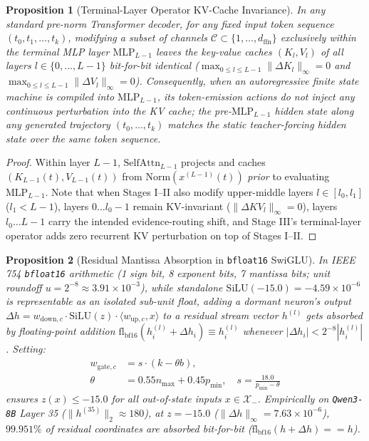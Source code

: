 \documentclass[10pt,twocolumn]{article}
\newtheorem{proposition}{Proposition}
\begin{document}
\begin{proposition}[Terminal-Layer Operator KV-Cache Invariance]
\label{prop:zerokv}
In any standard pre-norm Transformer decoder, for any fixed input token sequence $(t_0, t_1, \dots, t_k)$, modifying a subset of channels $\mathcal{C} \subset \{1, \dots, d_{\mathrm{ffn}}\}$ exclusively within the terminal MLP layer $\mathrm{MLP}_{L-1}$ leaves the key-value caches $(K_l, V_l)$ of all layers $l \in \{0, \dots, L-1\}$ bit-for-bit identical ($\max_{0 \le l \le L-1} \|\Delta K_l\|_\infty = 0$ and $\max_{0 \le l \le L-1} \|\Delta V_l\|_\infty = 0$). Consequently, when an autoregressive finite state machine is compiled into $\mathrm{MLP}_{L-1}$, its token-emission actions do not inject any continuous perturbation into the KV cache; the pre-$\mathrm{MLP}_{L-1}$ hidden state along any generated trajectory $(t_0, \dots, t_k)$ matches the static teacher-forcing hidden state over the same token sequence.
\end{proposition}
\begin{proof}
Within layer $L-1$, $\mathrm{SelfAttn}_{L-1}$ projects and caches $(K_{L-1}(t), V_{L-1}(t))$ from $\mathrm{Norm}(x^{(L-1)}(t))$ \emph{prior} to evaluating $\mathrm{MLP}_{L-1}$. Note that when Stages I--II also modify upper-middle layers $l \in [l_0, l_1]$ ($l_1 < L-1$), layers $0 \dots l_0-1$ remain KV-invariant ($\|\Delta KV_l\|_\infty = 0$), layers $l_0 \dots L-1$ carry the intended evidence-routing shift, and Stage III's terminal-layer operator adds zero recurrent KV perturbation on top of Stages I--II.
\end{proof}

\begin{proposition}[Residual Mantissa Absorption in \texttt{bfloat16} SwiGLU]
\label{prop:underflow}
In IEEE 754 \texttt{bfloat16} arithmetic (1 sign bit, 8 exponent bits, 7 mantissa bits; unit roundoff $u = 2^{-8} \approx 3.91 \times 10^{-3}$), while standalone $\mathrm{SiLU}(-15.0) = -4.59 \times 10^{-6}$ is representable as an isolated sub-unit float, adding a dormant neuron's output $\Delta h = w_{\mathrm{down},c} \cdot \mathrm{SiLU}(z) \cdot \langle w_{\mathrm{up},c}, x \rangle$ to a residual stream vector $h^{(l)}$ gets absorbed by floating-point addition $\mathrm{fl}_{\mathrm{bf16}}(h_i^{(l)} + \Delta h_i) \equiv h_i^{(l)}$ whenever $|\Delta h_i| < 2^{-8} |h_i^{(l)}|$. Setting:
\begin{equation}
\begin{aligned}
w_{\mathrm{gate}, c} &= s \cdot (k - \theta b), \\
\theta &= 0.55 n_{\max} + 0.45 p_{\min}, \quad s = \frac{18.0}{p_{\min} - \theta}
\end{aligned}
\end{equation}
ensures $z(x) \le -15.0$ for all out-of-state inputs $x \in \mathcal{X}_-$. Empirically on \texttt{Qwen3-8B} Layer 35 ($\|h^{(35)}\|_2 \approx 180$), at $z = -15.0$ ($\|\Delta h\|_\infty = 7.63 \times 10^{-6}$), $99.951\%$ of residual coordinates are absorbed bit-for-bit ($\mathrm{fl}_{\mathrm{bf16}}(h + \Delta h) == h$).
\end{proposition}
\end{document}
